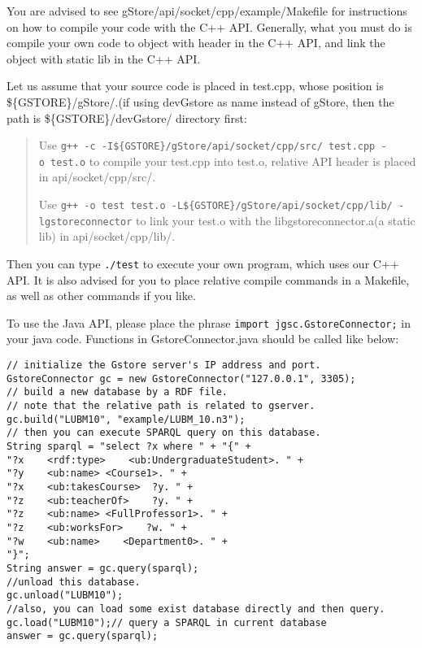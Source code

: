 \documentclass[titlepage, a4paper, 12pt]{article}
\begin{document}

You are advised to see gStore/api/socket/cpp/example/Makefile for instructions on how to compile your code with the C++ API. Generally, what you must do is compile your own code to object with header in the C++ API, and link the object with static lib in the C++ API.

Let us assume that your source code is placed in test.cpp, whose position is \$\{GSTORE\}/gStore/.(if using devGstore as name instead of gStore, then the path is \$\{GSTORE\}/devGstore/ directory first:

\begin{quote}
Use \texttt{g++\ -c\ -I\$\{GSTORE\}/gStore/api/socket/cpp/src/\ test.cpp\ -o\ test.o} to compile your test.cpp into test.o, relative API header is placed in api/socket/cpp/src/.

Use \texttt{g++\ -o\ test\ test.o\ -L\$\{GSTORE\}/gStore/api/socket/cpp/lib/\ -lgstoreconnector} to link your test.o with the libgstoreconnector.a(a static lib) in api/socket/cpp/lib/.
\end{quote}

Then you can type \texttt{./test} to execute your own program, which uses our C++ API. It is also advised for you to place relative compile commands in a Makefile, as well as other commands if you like.



To use the Java API, please place the phrase
\texttt{import\ jgsc.GstoreConnector;} in your java code. Functions in
GstoreConnector.java should be called like below:

\begin{verbatim}
// initialize the Gstore server's IP address and port.
GstoreConnector gc = new GstoreConnector("127.0.0.1", 3305);
// build a new database by a RDF file.
// note that the relative path is related to gserver.
gc.build("LUBM10", "example/LUBM_10.n3");
// then you can execute SPARQL query on this database.
String sparql = "select ?x where " + "{" +
"?x    <rdf:type>    <ub:UndergraduateStudent>. " +
"?y    <ub:name> <Course1>. " +
"?x    <ub:takesCourse>  ?y. " +
"?z    <ub:teacherOf>    ?y. " +
"?z    <ub:name> <FullProfessor1>. " +
"?z    <ub:worksFor>    ?w. " +
"?w    <ub:name>    <Department0>. " +
"}";
String answer = gc.query(sparql);
//unload this database.
gc.unload("LUBM10");
//also, you can load some exist database directly and then query.
gc.load("LUBM10");// query a SPARQL in current database
answer = gc.query(sparql);
\end{verbatim}
\end{document}
